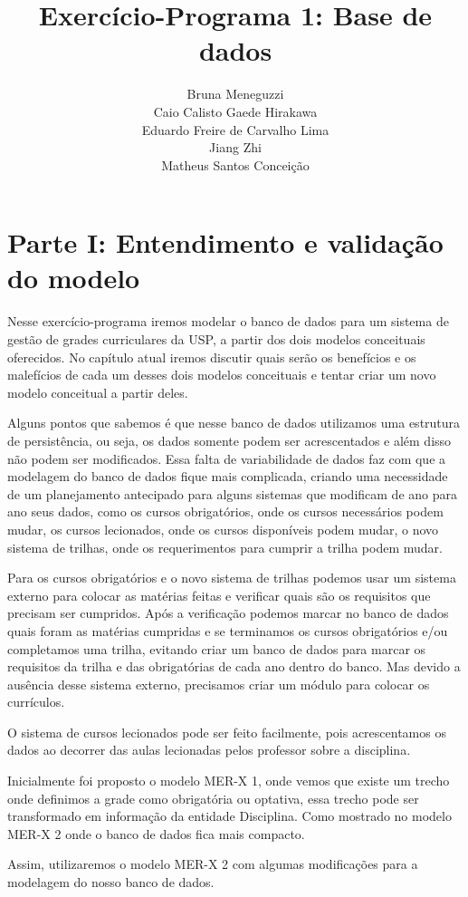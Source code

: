 \documentclass{report}
\author{Bruna Meneguzzi \\ Caio Calisto Gaede Hirakawa \\ Eduardo Freire de Carvalho Lima \\ Jiang Zhi \\ Matheus Santos Conceição}
\title{Exercício-Programa 1: Base de dados}
\begin{document}
\maketitle
\tableofcontents
\chapter{Parte I: Entendimento e validação do modelo}
Nesse exercício-programa iremos modelar o banco de dados para um sistema de gestão de grades curriculares da USP, a partir dos dois modelos conceituais oferecidos. No capítulo atual iremos discutir quais serão os benefícios e os malefícios de cada um desses dois modelos conceituais e tentar criar um novo modelo conceitual a partir deles.

Alguns pontos que sabemos é que nesse banco de dados utilizamos uma estrutura de persistência, ou seja, os dados somente podem ser acrescentados e além disso não podem ser modificados. Essa falta de variabilidade de dados faz com que a modelagem do banco de dados fique mais complicada, criando uma necessidade de um planejamento antecipado para alguns sistemas que modificam de ano para ano seus dados, como os cursos obrigatórios, onde os cursos necessários podem mudar, os cursos lecionados, onde os cursos disponíveis podem mudar, o novo sistema de trilhas, onde os requerimentos para cumprir a trilha podem mudar.

Para os cursos obrigatórios e o novo sistema de trilhas podemos usar um sistema externo para colocar as matérias feitas e verificar quais são os requisitos que precisam ser cumpridos. Após a verificação podemos marcar no banco de dados quais foram as matérias cumpridas e se terminamos os cursos obrigatórios e/ou completamos uma trilha, evitando criar um banco de dados para marcar os requisitos da trilha e das obrigatórias de cada ano dentro do banco. Mas devido a ausência desse sistema externo, precisamos criar um módulo para colocar os currículos.

O sistema de cursos lecionados pode ser feito facilmente, pois acrescentamos os dados ao decorrer das aulas lecionadas pelos  professor sobre a disciplina.

Inicialmente foi proposto o modelo MER-X 1, onde vemos que existe um trecho onde definimos a grade como obrigatória ou optativa, essa trecho pode ser transformado em informação da entidade Disciplina. Como mostrado no modelo MER-X 2 onde o banco de dados fica mais compacto.

Assim, utilizaremos o modelo MER-X 2 com algumas modificações para a modelagem do nosso banco de dados.
\end{document}
